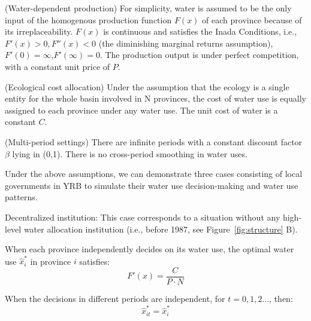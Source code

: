 \documentclass{nsr}
\begin{document}
\begin{ass}
    (Water-dependent production) For simplicity, water is assumed to be the only input of the homogenous production function $F(x)$ of each province because of its irreplaceability. $F(x)$ is continuous and satisfies the Inada Conditions, i.e., $F'(x)>0, F''(x)<0$ (the diminishing marginal returns assumption), $F'(0)=\infty$,$ F'(\infty)=0$. The production output is under perfect competition, with a constant unit price of $P$.
\end{ass}
\begin{ass}
    (Ecological cost allocation) Under the assumption that the ecology is a single entity for the whole basin involved in N provinces, the cost of water use is equally assigned to each province under any water use. The unit cost of water is a constant $C$.
\end{ass}
\begin{ass}
    (Multi-period settings) There are infinite periods with a constant discount factor $\beta$ lying in (0,1). There is no cross-period smoothing in water uses.
\end{ass}

Under the above assumptions, we can demonstrate three cases consisting of local governments in YRB to simulate their water use decision-making and water use patterns.

\begin{case} Decentralized institution:
    This case corresponds to a situation without any high-level water allocation institution (i.e., before 1987, see Figure~\ref{fig:structure} B).

    When each province independently decides on its water use, the optimal water use $\hat x_i^*$ in province $i$ satisfies:
    $$F'(x)=\frac{C}{P \cdot N}$$

    When the decisions in different periods are independent, for $t=0,1,2 \ldots$, then:
    $$\hat x_{it}^*=\hat x_i^*$$

\end{case}
\end{document}
